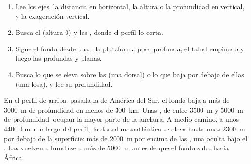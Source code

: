 \begin{method}
\begin{enumerate}
  \item Lee los ejes: la distancia en horizontal, la altura o la
        profundidad en vertical, y la exageración vertical.
  \item Busca el  (altura 0) y las , donde el perfil lo
        corta.
  \item Sigue el fondo desde una : la plataforma poco profunda, el
        talud empinado y luego las  profundas y planas.
  \item Busca lo que se eleva sobre las  (una dorsal) o lo que baja
        por debajo de ellas (una fosa), y lee su profundidad.
\end{enumerate}
\end{method}

\begin{example}
En el perfil de arriba, pasada la  de América del Sur, el fondo baja
a más de \qty{3000}{m} de profundidad en menos de \qty{300}{km}. Unas
, de entre \qty{3500}{m} y \qty{5000}{m} de profundidad,
ocupan la mayor parte de la anchura. A medio camino, a unos
\qty{4400}{km} a lo largo del perfil, la dorsal mesoatlántica se eleva
hasta unos \qty{2300}{m} por debajo de la superficie: más de
\qty{2000}{m} por encima de las , una  oculta bajo el
. Las  vuelven a hundirse a más de \qty{5000}{m} antes de que
el fondo suba hacia África.
\end{example}


